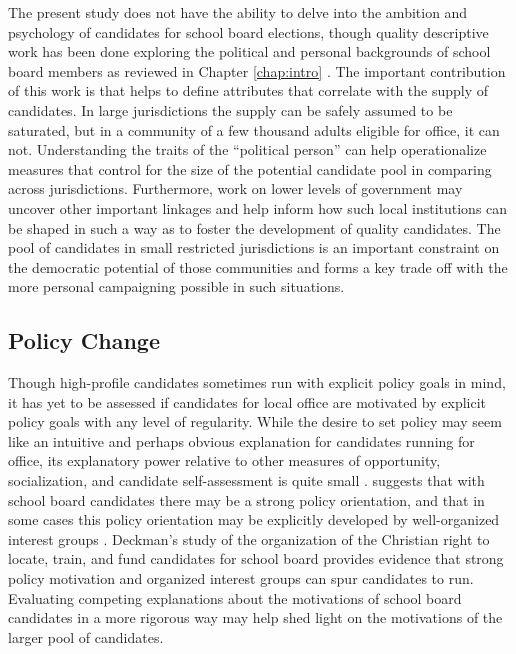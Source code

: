 The present study does not have the ability to delve into the 
ambition and psychology of candidates for school board elections, though quality 
descriptive work has been done exploring the political and personal backgrounds of 
school board members as reviewed in Chapter \ref{chap:intro} 
\citep{RefWorks:321, RefWorks:322, RefWorks:333}. The important contribution of 
this work is that helps to define attributes that correlate with the supply of 
candidates. In large jurisdictions the supply can be safely assumed to be 
saturated, but in a community of a few thousand adults eligible for office, it 
can not. Understanding the traits of the ``political person'' can help 
operationalize measures that control for the size of the potential candidate pool 
in comparing across jurisdictions. Furthermore, work on lower levels of government 
may uncover other important linkages and help inform how such local institutions 
can be shaped in such a way as to foster the development of quality candidates. 
The pool of candidates in small restricted jurisdictions is an important constraint 
on the democratic potential of those communities and forms a key trade off with the more 
personal campaigning possible in such situations. 


\subsection{Policy Change}

Though high-profile candidates sometimes run with explicit policy goals 
in mind, it has yet to be assessed if candidates for local office are motivated 
by explicit policy goals with any level of regularity. While the desire to set 
policy may seem like an intuitive and perhaps obvious explanation for candidates 
running for office, its explanatory power relative to other measures of opportunity, 
socialization, and candidate self-assessment is quite small \citep{AJPS:AJPS147}. 
\citet{deckman1} suggests that with school board candidates there may be a strong policy 
orientation, and that in some cases this policy orientation may be explicitly developed by 
well-organized interest groups \citep{RefWorks:240}. Deckman's study of the 
organization of the Christian right to locate, train, and fund candidates for 
school board provides evidence that strong policy motivation and organized 
interest groups can spur candidates to run. Evaluating competing explanations 
about the motivations of school board candidates in a more rigorous way may help 
shed light on the motivations of the larger pool of candidates. 

